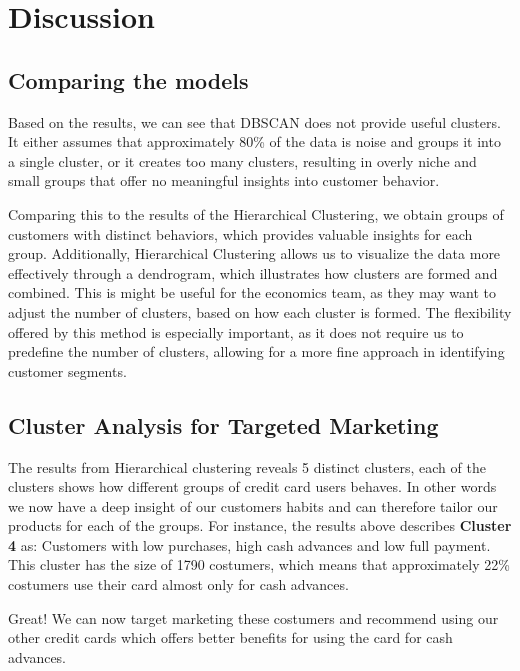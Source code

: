 \section{Discussion}


\subsection{Comparing the models}
Based on the results, we can see that DBSCAN does not provide useful clusters. 
It either assumes that approximately 80\% of the data is noise and groups it into a single cluster, or it creates too many clusters, resulting in overly niche and small groups that offer no meaningful insights into customer behavior.
\par
Comparing this to the results of the Hierarchical Clustering, we obtain groups of customers with distinct behaviors, which provides valuable insights for each group. Additionally, Hierarchical Clustering allows us to visualize the data more effectively through a dendrogram, which illustrates how clusters are formed and combined.
This is might be useful for the economics team, as they may want to adjust the number of clusters, based on how each cluster is formed. 
The flexibility offered by this method is especially important, as it does not require us to predefine the number of clusters, allowing for a more fine approach in identifying customer segments.


\subsection{Cluster Analysis for Targeted Marketing}
The results from Hierarchical clustering reveals 5 distinct clusters, 
each of the clusters shows how different groups of credit card users behaves. 
In other words we now have a deep insight of our customers habits and can therefore tailor our products for each of the groups.
For instance, the results above describes \textbf{Cluster 4} as: Customers with low purchases, high cash advances and low full payment. 
This cluster has the size of 1790 costumers, which means that approximately 22\% costumers use their card almost only for cash advances. 
\par
Great! We can now target marketing these costumers and recommend using our other credit cards which offers better benefits for using the card for cash advances.

